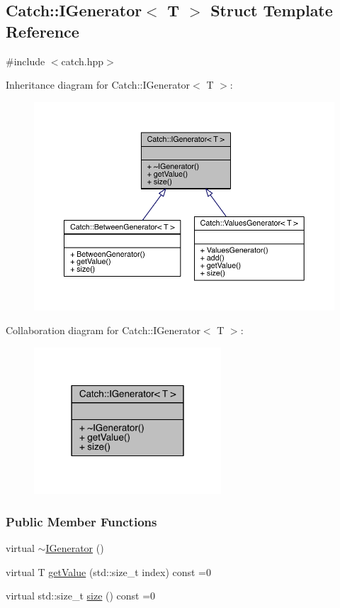 \hypertarget{a00034}{}\subsection{Catch\+:\+:I\+Generator$<$ T $>$ Struct Template Reference}
\label{a00034}


{\ttfamily \#include $<$catch.\+hpp$>$}



Inheritance diagram for Catch\+:\+:I\+Generator$<$ T $>$\+:\nopagebreak
\begin{figure}[H]
\begin{center}
\leavevmode
\includegraphics[width=350pt]{a00200}
\end{center}
\end{figure}


Collaboration diagram for Catch\+:\+:I\+Generator$<$ T $>$\+:\nopagebreak
\begin{figure}[H]
\begin{center}
\leavevmode
\includegraphics[width=198pt]{a00201}
\end{center}
\end{figure}
\subsubsection*{Public Member Functions}
\begin{DoxyCompactItemize}
\item 
virtual \hyperlink{a00034_a0622037f4617e09aa8c584b0144d4a1a}{$\sim$\+I\+Generator} ()
\item 
virtual T \hyperlink{a00034_ad69e937cb66dba3ed9429c42abf4fce3}{get\+Value} (std\+::size\+\_\+t index) const =0
\item 
virtual std\+::size\+\_\+t \hyperlink{a00034_a2e317253b03e838b6065ce69719a198e}{size} () const =0
\end{DoxyCompactItemize}


